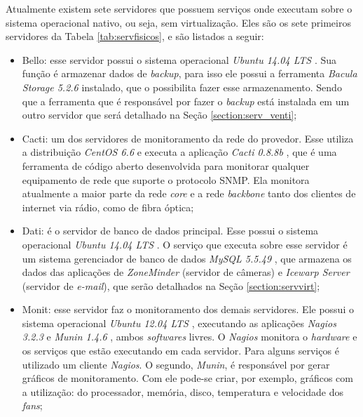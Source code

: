 Atualmente existem sete servidores que possuem serviços onde executam sobre o sistema operacional nativo, ou seja, sem virtualização. 
Eles são os sete primeiros servidores da Tabela \ref{tab:servfisicos}, e são listados a seguir:
\begin{itemize}
 \item Bello: esse servidor possui o sistema operacional \textit{Ubuntu 14.04 \ac{LTS}} \cite{ubuntu}. Sua função é armazenar dados de 
 \textit{backup}, para isso ele possui a ferramenta \textit{Bacula Storage 5.2.6} \cite{bacula} instalado, que o possibilita fazer esse 
 armazenamento. Sendo que a ferramenta que é responsável por fazer o \textit{backup} está instalada em um outro servidor que será detalhado na 
 Seção \ref{section:serv_venti};
 
 \item Cacti: um dos servidores de monitoramento da rede do provedor. Esse utiliza a distribuição \textit{CentOS 6.6} \cite{centos} e executa a 
 aplicação \textit{Cacti 0.8.8b} \cite{cacti}, que é uma ferramenta de código aberto desenvolvida para monitorar qualquer equipamento de rede que 
 suporte o protocolo \ac{SNMP}. Ela monitora atualmente a maior parte da rede \textit{core} e a rede \textit{backbone} tanto dos clientes de 
 internet via rádio, como de fibra óptica;
 
 \item Dati: é o servidor de banco de dados principal. Esse possui o sistema operacional \textit{Ubuntu 14.04 \ac{LTS}} \cite{ubuntu}. 
 O serviço que executa sobre esse servidor é um sistema gerenciador de banco de dados \textit{MySQL 5.5.49} \cite{mysql}, que armazena os dados 
 das aplicações de \textit{ZoneMinder} \cite{zoneminder} (servidor de câmeras) e \textit{Icewarp Server} (servidor de \textit{e-mail}), que serão 
 detalhados na Seção \ref{section:servvirt};
 
 \item Monit: esse servidor faz o monitoramento dos demais servidores. Ele possui o sistema operacional \textit{Ubuntu 12.04 \ac{LTS}} 
 \cite{ubuntu}, executando as aplicações \textit{Nagios 3.2.3} \cite{nagios} e \textit{Munin 1.4.6} \cite{munin}, ambos \textit{softwares} livres. 
 O \textit{Nagios} monitora o \textit{hardware} e os serviços que estão executando em cada servidor. Para alguns serviços é utilizado um cliente 
 \textit{Nagios}. O segundo, \textit{Munin}, é responsável por gerar gráficos de monitoramento. Com ele pode-se criar, por exemplo, gráficos 
 com a utilização: do processador, memória, disco, temperatura e velocidade dos \textit{fans};
 

\end{itemize}
